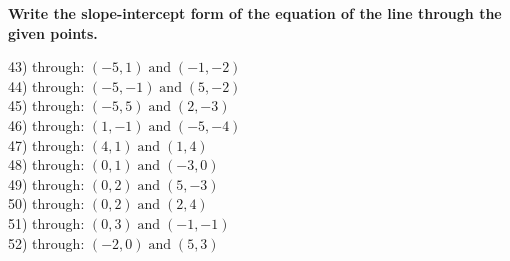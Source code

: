 \documentclass[12pt]{book}
\theoremstyle{definition}
\newcommand{\tmop}[1]{\ensuremath{\operatorname{#1}}}
\begin{document}
{\bf Write the slope-intercept form of the equation of the line through the given points.}
\begin{multicols}{2}
  43) through: $(- 5, 1) \tmop{and} (- 1, - 2)$\\
  44) through: $(- 5, - 1) \tmop{and} (5, - 2)$\\
  45) through: $(- 5, 5) \tmop{and} (2, - 3)$\\
  46) through: $(1, - 1) \tmop{and} (- 5, - 4)$\\
  47) through: $(4, 1) \tmop{and} (1, 4)$\\
  48) through: $(0, 1) \tmop{and} (- 3, 0)$\\
  49) through: $(0, 2) \tmop{and} (5, - 3)$\\
  50) through: $(0, 2) \tmop{and} (2, 4)$\\
  51) through: $(0, 3) \tmop{and} (- 1, - 1)$\\
  52) through: $(- 2, 0) \tmop{and} (5, 3)$
\end{multicols}
\end{document}
